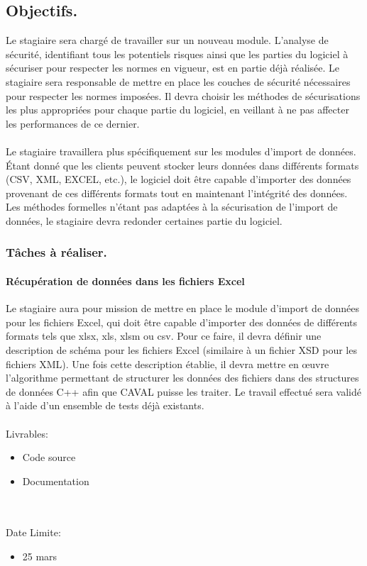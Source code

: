 \documentclass[init,francais]{rapportPFE}  %
\begin{document}
\subsection{Objectifs.}

Le stagiaire sera chargé de travailler sur un nouveau module. L'analyse de sécurité, identifiant tous les potentiels risques ainsi que les parties du logiciel à sécuriser pour respecter les normes en vigueur, est en partie déjà réalisée.
Le stagiaire sera responsable de mettre en place les couches de sécurité nécessaires pour respecter les normes imposées. Il devra choisir les méthodes de sécurisations les plus appropriées pour chaque partie du logiciel, en veillant à ne pas affecter les performances de ce dernier.
\\~\\
Le stagiaire travaillera plus spécifiquement sur les modules d'import de données. Étant donné que les clients peuvent stocker leurs données dans différents formats (CSV, XML, EXCEL, etc.),
le logiciel doit être capable d'importer des données provenant de ces différents formats tout en maintenant l'intégrité des données. 
Les méthodes formelles n'étant pas adaptées à la sécurisation de l'import de données, le stagiaire devra redonder certaines partie du logiciel.

\subsubsection{Tâches à réaliser.}

\paragraph*{Récupération de données dans les fichiers Excel}


Le stagiaire aura pour mission de mettre en place le module d'import de données pour les fichiers Excel, 
qui doit être capable d'importer des données de différents formats tels que xlsx, xls, xlsm ou csv. 
Pour ce faire, il devra définir une description de schéma pour les fichiers Excel (similaire à un fichier XSD pour les fichiers XML). 
Une fois cette description établie, il devra mettre en œuvre l'algorithme permettant de structurer les données des fichiers dans des structures de données C++ 
afin que CAVAL puisse les traiter.
Le travail effectué sera validé à l'aide d'un ensemble de tests déjà existants.\\~\\
Livrables:
\begin{itemize}
  \item Code source
  \item Documentation
\end{itemize}\\~\\
Date Limite:
\begin{itemize}
  \item 25 mars
\end{itemize}
\end{document}
